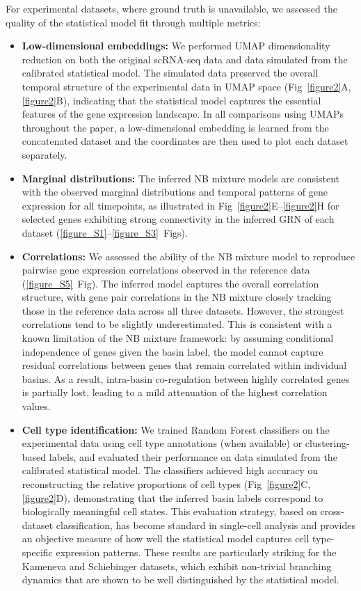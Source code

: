 \documentclass[a4paper, 11pt]{article}
\theoremstyle{plain}
\theoremstyle{remark}
\newcommand*{\firstreview}[1]{{\color{black}#1}}
\begin{document}
For experimental datasets, where ground truth is unavailable, we assessed the quality of the statistical model fit through multiple metrics:
\begin{itemize}
    \item \textbf{Low-dimensional embeddings:} We performed UMAP dimensionality reduction on both the original scRNA-seq data and data simulated from the calibrated statistical model. The simulated data preserved the overall temporal structure of the experimental data in UMAP space (Fig~\ref{figure2}A, \ref{figure2}B), indicating that the statistical model captures the essential features of the gene expression landscape. In all comparisons using UMAPs throughout the paper, a low-dimensional embedding is learned from the concatenated dataset and the coordinates are then used to plot each dataset separately.
    \item \textbf{Marginal distributions:} The inferred NB mixture models \firstreview{are consistent with} the observed marginal distributions and temporal patterns of gene expression for all timepoints, as illustrated in Fig~\ref{figure2}E--\ref{figure2}H for selected genes exhibiting strong connectivity in the inferred GRN of each dataset (\ref{figure_S1}--\ref{figure_S3}~Figs).
    \item \textbf{Correlations:} We assessed the ability of the NB mixture model to reproduce pairwise gene expression correlations observed in the reference data (\ref{figure_S5}~Fig). The inferred model captures the overall correlation structure, with gene pair correlations in the NB mixture closely tracking those in the reference data across all three datasets. However, the strongest correlations tend to be slightly underestimated. This is consistent with a known limitation of the NB mixture framework: by assuming conditional independence of genes given the basin label, the model cannot capture residual correlations between genes that remain correlated within individual basins. As a result, intra-basin co-regulation between highly correlated genes is partially lost, leading to a mild attenuation of the highest correlation values. 
    \item \textbf{Cell type identification:} We trained Random Forest classifiers on the experimental data using cell type annotations (when available) or clustering-based labels, and evaluated their performance on data simulated from the calibrated statistical model. The classifiers achieved high accuracy on reconstructing the relative proportions of cell types (Fig~\ref{figure2}C, \ref{figure2}D), demonstrating that the inferred basin labels correspond to biologically meaningful cell states. This evaluation strategy, based on cross-dataset classification, has become standard in single-cell analysis \cite{stuart2019comprehensive} and provides an objective measure of how well the statistical model captures cell type-specific expression patterns.
    These results are particularly striking for the Kameneva and Schiebinger datasets, which exhibit non-trivial branching dynamics that are shown to be well distinguished by the statistical model.
\end{itemize}
\end{document}
